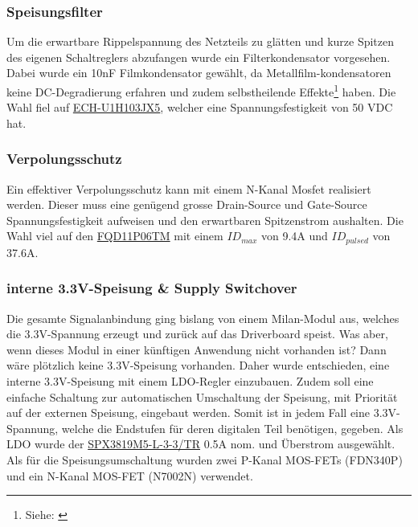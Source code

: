 \subsubsection{Speisungsfilter}
Um die erwartbare Rippelspannung des Netzteils zu glätten und kurze Spitzen des eigenen Schaltreglers abzufangen wurde ein Filterkondensator vorgesehen. Dabei wurde ein 10nF Filmkondensator gewählt, da Metallfilm-kondensatoren keine DC-Degradierung erfahren und zudem selbstheilende Effekte\footnote{Siehe: \cite{healingofhilmcaps}} haben. Die Wahl fiel auf \href{https://industrial.panasonic.com/ww/products/pt/film-cap-electroequip/models/ECHU1H103JX5}{ECH-U1H103JX5}, welcher eine Spannungsfestigkeit von 50 VDC hat.
\subsubsection{Verpolungsschutz}
Ein effektiver Verpolungsschutz kann mit einem N-Kanal Mosfet realisiert werden. Dieser muss eine genügend grosse Drain-Source und Gate-Source Spannungsfestigkeit aufweisen und den erwartbaren Spitzenstrom aushalten. Die Wahl viel auf den \href{https://www.onsemi.com/pdf/datasheet/fqu11p06-d.pdf}{FQD11P06TM} mit einem $ID_{max}$ von 9.4A und $ID_{pulsed}$ von 37.6A.
\subsubsection{interne 3.3V-Speisung \& Supply Switchover}
Die gesamte Signalanbindung ging bislang von einem Milan-Modul aus, welches die 3.3V-Spannung erzeugt und zurück auf das Driverboard speist. Was aber, wenn dieses Modul in einer künftigen Anwendung nicht vorhanden ist? Dann wäre plötzlich keine 3.3V-Speisung vorhanden. Daher wurde entschieden, eine interne 3.3V-Speisung mit einem LDO-Regler einzubauen. Zudem soll eine einfache Schaltung zur automatischen Umschaltung der Speisung, mit Priorität auf der externen Speisung, eingebaut werden. Somit ist in jedem Fall eine 3.3V-Spannung, welche die Endstufen für deren digitalen Teil benötigen, gegeben. Als LDO wurde der \href{https://mm.digikey.com/Volume0/opasdata/d220001/medias/docus/6642/1016_SPX3819.pdf}{SPX3819M5-L-3-3/TR} 0.5A nom. und Überstrom ausgewählt. Als für die Speisungsumschaltung wurden zwei P-Kanal MOS-FETs (FDN340P) und ein N-Kanal MOS-FET (N7002N) verwendet.
